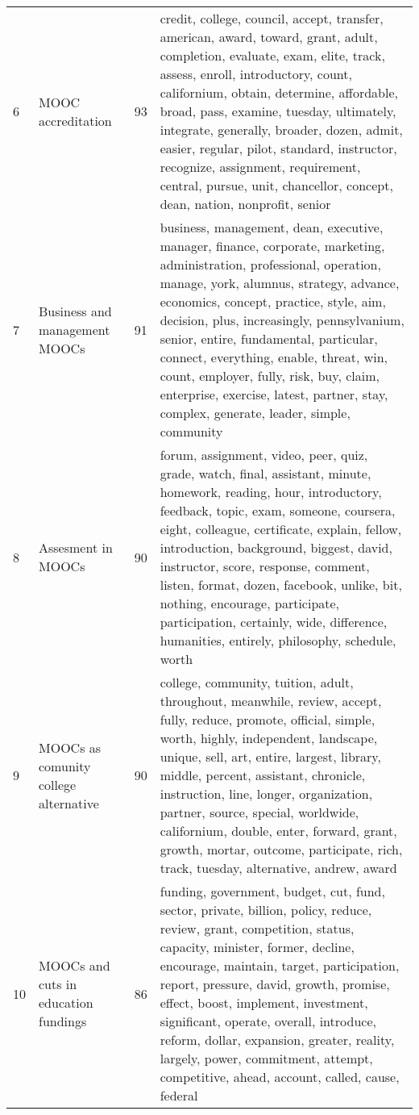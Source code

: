 \begin{table}[ht]
{\begin{tabularx}{\textwidth}{llrX}
    6 & MOOC accreditation & 93 & credit, college, council, accept, transfer, american, award, toward, grant, adult, completion, evaluate, exam, elite, track, assess, enroll, introductory, count, californium, obtain, determine, affordable, broad, pass, examine, tuesday, ultimately, integrate, generally, broader, dozen, admit, easier, regular, pilot, standard, instructor, recognize, assignment, requirement, central, pursue, unit, chancellor, concept, dean, nation, nonprofit, senior \\ 
    7 & Business and management MOOCs & 91 & business, management, dean, executive, manager, finance, corporate, marketing, administration, professional, operation, manage, york, alumnus, strategy, advance, economics, concept, practice, style, aim, decision, plus, increasingly, pennsylvanium, senior, entire, fundamental, particular, connect, everything, enable, threat, win, count, employer, fully, risk, buy, claim, enterprise, exercise, latest, partner, stay, complex, generate, leader, simple, community \\ 
    8 & Assesment in MOOCs & 90 & forum, assignment, video, peer, quiz, grade, watch, final, assistant, minute, homework, reading, hour, introductory, feedback, topic, exam, someone, coursera, eight, colleague, certificate, explain, fellow, introduction, background, biggest, david, instructor, score, response, comment, listen, format, dozen, facebook, unlike, bit, nothing, encourage, participate, participation, certainly, wide, difference, humanities, entirely, philosophy, schedule, worth \\ 
    9 & MOOCs as comunity college alternative & 90 & college, community, tuition, adult, throughout, meanwhile, review, accept, fully, reduce, promote, official, simple, worth, highly, independent, landscape, unique, sell, art, entire, largest, library, middle, percent, assistant, chronicle, instruction, line, longer, organization, partner, source, special, worldwide, californium, double, enter, forward, grant, growth, mortar, outcome, participate, rich, track, tuesday, alternative, andrew, award \\ 
   10 & MOOCs and cuts in education fundings & 86 & funding, government, budget, cut, fund, sector, private, billion, policy, reduce, review, grant, competition, status, capacity, minister, former, decline, encourage, maintain, target, participation, report, pressure, david, growth, promise, effect, boost, implement, investment, significant, operate, overall, introduce, reform, dollar, expansion, greater, reality, largely, power, commitment, attempt, competitive, ahead, account, called, cause, federal \\ 

\end{tabularx}}
\end{table}
